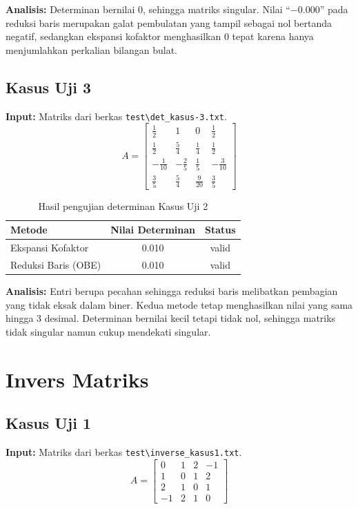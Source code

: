 \documentclass[12pt,a4paper]{report}
\begin{document}
\textbf{Analisis:} Determinan bernilai 0, sehingga matriks singular. Nilai ``$-0.000$'' pada reduksi baris merupakan galat pembulatan yang tampil sebagai nol bertanda negatif, sedangkan ekspansi kofaktor menghasilkan $0$ tepat karena hanya menjumlahkan perkalian bilangan bulat.

\subsection{Kasus Uji 3}
\textbf{Input:} Matriks dari berkas \texttt{test\textbackslash det\_kasus-3.txt}.
\[
A = \begin{bmatrix}
    \frac{1}{2} & 1 & 0 &\frac{1}{2} \\
    \frac{1}{2} &\frac{5}{4} &\frac{1}{4} &\frac{1}{2} \\
    -\frac{1}{10}& -\frac{2}{5}& \frac{1}{5}& -\frac{3}{10} \\
    \frac{3}{5} &\frac{5}{4} &\frac{9}{20}& \frac{3}{5}
\end{bmatrix}
\]
 
\begin{table}[H]
    \centering
    \caption{Hasil pengujian determinan Kasus Uji 2}
    \begin{tabular}{|l|c|c|}
        \hline
        \textbf{Metode} & \textbf{Nilai Determinan} & \textbf{Status} \\
        \hline
        Ekspansi Kofaktor & 0.010 & valid \\
        Reduksi Baris (OBE) & 0.010 & valid \\
        \hline
    \end{tabular}
\end{table}
 
\textbf{Analisis:} Entri berupa pecahan sehingga reduksi baris melibatkan pembagian yang tidak eksak dalam biner. Kedua metode tetap menghasilkan nilai yang sama hingga 3 desimal. Determinan bernilai kecil tetapi tidak nol, sehingga matriks tidak singular namun cukup mendekati singular. 

\section{Invers Matriks}
 
\subsection{Kasus Uji 1}
\textbf{Input:} Matriks dari berkas \texttt{test\textbackslash inverse\_kasus1.txt}.
\[
A = \begin{bmatrix}
     0 &1 &2 &-1 \\
    1 &0 &1 &2 \\
    2 &1 &0 &1 \\
    -1 &2 &1& 0
\end{bmatrix}
\]
 
\end{document}
